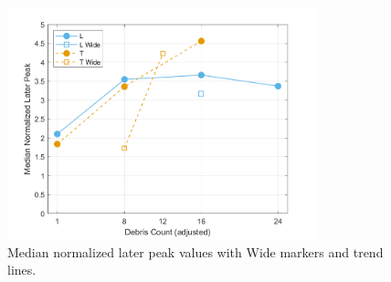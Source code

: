 \documentclass{article}
\begin{document}
\begin{figure}[htbp]
    \centering
    \includegraphics[width=0.8\textwidth]{LaterPeak_Regular_RemappedT_MediansTrend.png}
    \caption{Median normalized later peak values with Wide markers and trend lines.}
    \label{fig:laterpeak_medians_trend}
\end{figure}

\end{document}
